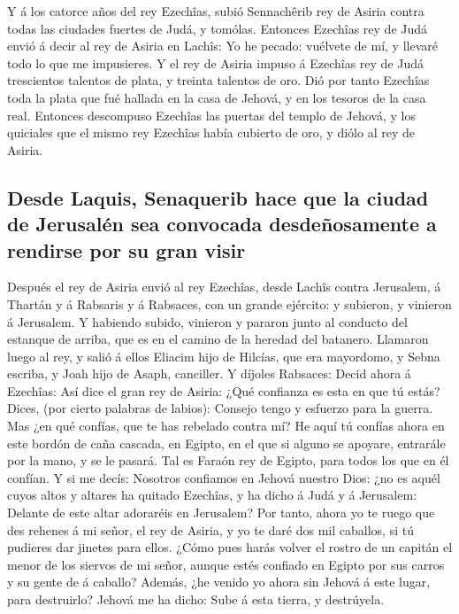  Y á los catorce años del rey Ezechîas, subió Sennachêrib
rey de Asiria contra todas las ciudades fuertes de Judá, y tomólas.
 Entonces Ezechîas rey de Judá envió á decir al rey de
Asiria en Lachîs: Yo he pecado: vuélvete de mí, y llevaré todo lo que me
impusieres. Y el rey de Asiria impuso á Ezechîas rey de Judá trescientos
talentos de plata, y treinta talentos de oro.  Dió por
tanto Ezechîas toda la plata que fué hallada en la casa de Jehová, y en
los tesoros de la casa real.  Entonces descompuso
Ezechîas las puertas del templo de Jehová, y los quiciales que el mismo
rey Ezechîas había cubierto de oro, y diólo al rey de Asiria.

\hypertarget{desde-laquis-senaquerib-hace-que-la-ciudad-de-jerusaluxe9n-sea-convocada-desdeuxf1osamente-a-rendirse-por-su-gran-visir}{%
\subsection{Desde Laquis, Senaquerib hace que la ciudad de Jerusalén sea
convocada desdeñosamente a rendirse por su gran
visir}\label{desde-laquis-senaquerib-hace-que-la-ciudad-de-jerusaluxe9n-sea-convocada-desdeuxf1osamente-a-rendirse-por-su-gran-visir}}

 Después el rey de Asiria envió al rey Ezechîas, desde
Lachîs contra Jerusalem, á Thartán y á Rabsaris y á Rabsaces, con un
grande ejército: y subieron, y vinieron á Jerusalem. Y habiendo subido,
vinieron y pararon junto al conducto del estanque de arriba, que es en
el camino de la heredad del batanero.  Llamaron luego al
rey, y salió á ellos Eliacim hijo de Hilcías, que era mayordomo, y Sebna
escriba, y Joah hijo de Asaph, canciller.  Y díjoles
Rabsaces: Decid ahora á Ezechîas: Así dice el gran rey de Asiria: ¿Qué
confianza es esta en que tú estás?  Dices, (por cierto
palabras de labios): Consejo tengo y esfuerzo para la guerra. Mas ¿en
qué confías, que te has rebelado contra mí?  He aquí tú
confías ahora en este bordón de caña cascada, en Egipto, en el que si
alguno se apoyare, entrarále por la mano, y se le pasará. Tal es Faraón
rey de Egipto, para todos los que en él confían.  Y si me
decís: Nosotros confiamos en Jehová nuestro Dios: ¿no es aquél cuyos
altos y altares ha quitado Ezechîas, y ha dicho á Judá y á Jerusalem:
Delante de este altar adoraréis en Jerusalem?  Por tanto,
ahora yo te ruego que des rehenes á mi señor, el rey de Asiria, y yo te
daré dos mil caballos, si tú pudieres dar jinetes para ellos.
 ¿Cómo pues harás volver el rostro de un capitán el menor
de los siervos de mi señor, aunque estés confiado en Egipto por sus
carros y su gente de á caballo?  Además, ¿he venido yo
ahora sin Jehová á este lugar, para destruirlo? Jehová me ha dicho: Sube
á esta tierra, y destrúyela.

